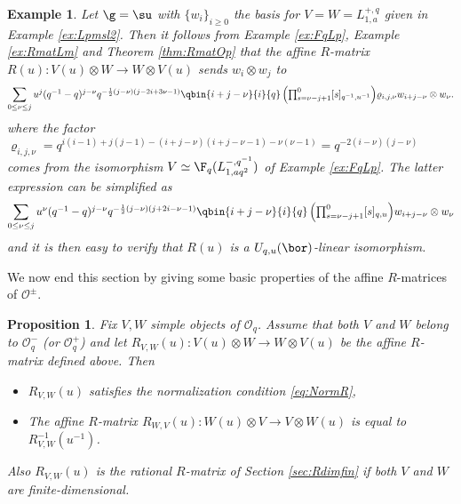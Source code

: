 \documentclass[11pt]{amsart}
\newtheorem{prop}[theorem]{Proposition}
\newtheorem{example}[theorem]{Example}
\theoremstyle{definition}
\theoremstyle{remark}
\numberwithin{equation}{section}
\begin{document}
\begin{example}\label{ex:RmatLp} Let $\g = \su$ with $\{w_i\}_{i\geq 0}$ the basis for $V = W = L_{1,a}^{+,q}$ given in Example \ref{ex:Lpmsl2}. Then it follows from Example \ref{ex:FqLp}, Example \ref{ex:RmatLm} and Theorem \ref{thm:RmatOp} that the affine $R$-matrix $R(u):V(u)\otimes W \rightarrow W\otimes V(u)$ sends $w_i\otimes w_j$ to
$$ \sum_{0\leq \nu\leq j}{\textstyle u^j(q^{-1}-q)^{j-\nu}q^{-\frac{1}{2}(j-\nu)(j-2i+3\nu-1)}\qbin{i+j-\nu}{i}{q}\left(\prod_{s=\nu-j+1}^0 [s]_{q^{-1},u^{-1}}\right)}\varrho_{i,j,\nu} w_{i+j-\nu}\otimes w_{\nu}.$$
where the factor $\varrho_{i,j,\nu} = q^{i(i-1)+j(j-1)-(i+j-\nu)(i+j-\nu-1)-\nu(\nu-1)} = q^{-2(i-\nu)(j-\nu)}$ comes from the isomorphism $V\simeq \F_q(L_{1,a q^2}^{-,q^{-1}})$ of Example \ref{ex:FqLp}. The latter expression can be simplified as 
$$ \sum_{0\leq \nu\leq j}{\textstyle u^{\nu}(q^{-1}-q)^{j-\nu}q^{-\frac{1}{2}(j-\nu)(j+2i-\nu-1)}\qbin{i+j-\nu}{i}{q}\left(\prod_{s=\nu-j+1}^0 [s]_{q,u}\right)}w_{i+j-\nu}\otimes w_{\nu}$$
and it is then easy to verify that $R(u)$ is a $U_{q,u}(\bor)$-linear isomorphism.
\end{example}
We now end this section by giving some basic properties of the affine $R$-matrices of $\mathcal{O}^{\pm}$. 
\begin{prop} Fix $V,W$ simple objects of $\mathcal{O}_q$. Assume that both $V$ and $W$ belong to $\mathcal{O}_q^{-}$ (or $\mathcal{O}_q^+$) and let $R_{V,W}(u):V(u)\otimes W\rightarrow W\otimes V(u)$ be the affine $R$-matrix defined above. Then
\begin{itemize}
\item[(i)] $R_{V,W}(u)$ satisfies the normalization condition \eqref{eq:NormR},
\item[(ii)] The affine $R$-matrix $R_{W,V}(u):W(u)\otimes V\rightarrow V\otimes W(u)$ is equal to $R_{V,W}^{-1}(u^{-1})$.
\end{itemize}
Also $R_{V,W}(u)$ is the rational $R$-matrix of Section \ref{sec:Rdimfin} if both $V$ and $W$ are finite-dimensional.
\end{prop}
\end{document}
